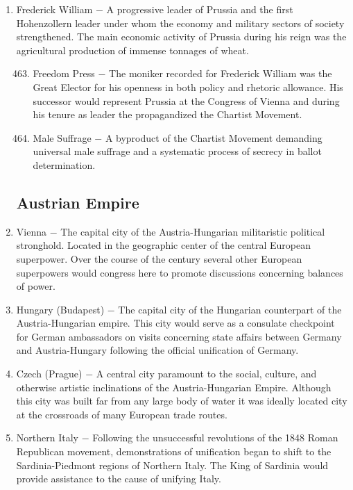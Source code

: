 \documentclass[12pt]{article}
\begin{document}
\begin{enumerate}
\item Frederick William $-$ A progressive leader of Prussia and the first Hohenzollern leader under whom the economy and military sectors of society strengthened. The main economic activity of Prussia during his reign was the agricultural production of immense tonnages of wheat.

\begin{enumerate}[label=\arabic{*}.]
\setcounter{enumii}{462}

\item Freedom Press $-$ The moniker recorded for Frederick William was the Great Elector for his openness in both policy and rhetoric allowance. His successor would represent Prussia at the Congress of Vienna and during his tenure as leader the propagandized the Chartist Movement.

\item Male Suffrage $-$ A byproduct of the Chartist Movement demanding universal male suffrage and a systematic process of secrecy in ballot determination.

\end{enumerate}
\setcounter{enumi}{464}

\subsection{Austrian Empire}

\item Vienna $-$ The capital city of the Austria-Hungarian militaristic political stronghold. Located in the geographic center of the central European superpower. Over the course of the  century several other European superpowers would congress here to promote discussions concerning balances of power.

\item Hungary (Budapest) $-$ The capital city of the Hungarian counterpart of the Austria-Hungarian empire. This city would serve as a consulate checkpoint for German ambassadors on visits concerning state affairs between Germany and Austria-Hungary following the official unification of Germany.

\item Czech (Prague) $-$ A central city paramount to the social, culture, and otherwise artistic inclinations of the Austria-Hungarian Empire. Although this city was built far from any large body of water it was ideally located city at the crossroads of many European trade routes.

\item Northern Italy $-$ Following the unsuccessful revolutions of the 1848 Roman Republican movement, demonstrations of unification began to shift to the Sardinia-Piedmont regions of Northern Italy. The King of Sardinia would provide assistance to the cause of unifying Italy.


\end{enumerate}
\end{document}
